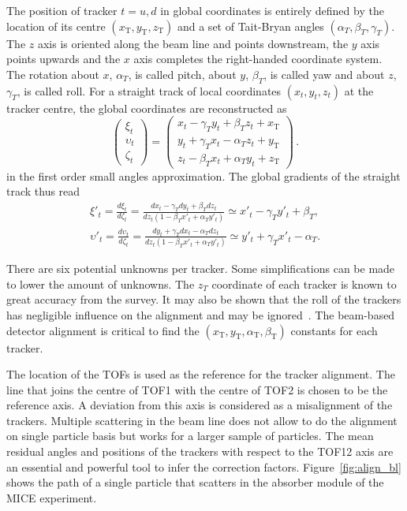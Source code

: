 The position of tracker $t=u,d$ in global coordinates is entirely defined by the location of its centre $(x_\mathrm{T},y_\mathrm{T},z_\mathrm{T})$ and a set of Tait-Bryan angles $(\alpha_T,\beta_T,\gamma_T)$. The $z$ axis is oriented along the beam line and points downstream, the $y$ axis points upwards and the $x$ axis completes the right-handed coordinate system. The rotation about $x$, $\alpha_T$, is called pitch, about $y$, $\beta_T$, is called yaw and about $z$, $\gamma_T$, is called roll. For a straight track of local coordinates $(x_t,y_t,z_t)$ at the tracker centre, the global coordinates are reconstructed as
\begin{equation}
\begin{pmatrix}
\xi_t \\
\upsilon_t \\
\zeta_t  
\end{pmatrix} =
\begin{pmatrix}
x_t-\gamma_T y_t+\beta_T z_t+x_\mathrm{T} \\
y_t+\gamma_T x_t-\alpha_T z_t+y_\mathrm{T} \\
z_t-\beta_T x_t+\alpha_T y_t+z_\mathrm{T}
\end{pmatrix}\, .
\label{eq:rot_matrix}
\end{equation}
in the first order small angles approximation. The global gradients of the straight track thus read
\begin{equation}
\begin{gathered}
\xi'_t = \frac{d\xi_t}{d\zeta_t} = \frac{dx_t-\gamma_Tdy_t+\beta_Tdz_t}{dz_t\left(1-\beta_Tx'_t+\alpha_Ty'_t\right)} \simeq x'_t-\gamma_T y'_t +\beta_T, \\
\upsilon'_t = \frac{d\upsilon_t}{d\zeta_t} = \frac{dy_t+\gamma_Tdx_t-\alpha_Tdz_t}{dz_t\left(1-\beta_Tx'_t+\alpha_Ty'_t\right)} \simeq y'_t+\gamma_T x'_t -\alpha_T.
\end{gathered}
\label{eq:global_grad}
\end{equation}

There are six potential unknowns per tracker. Some simplifications can be made to lower the amount of unknowns. The $z_T$ coordinate of each tracker is known to great accuracy from the survey. It may also be shown that the roll of the trackers has negligible influence on the alignment and may be ignored~\cite{2018arXiv1805.06623T}. The beam-based detector alignment is critical to find the $(x_\mathrm{T}, y_\mathrm{T}, \alpha_\mathrm{T}, \beta_\mathrm{T})$ constants for each tracker.

The location of the TOFs is used as the reference for the tracker alignment. The line that joins the centre of TOF1 with the centre of TOF2 is chosen to be the reference axis. A deviation from this axis is considered as a misalignment of the trackers. Multiple scattering in the beam line does not allow to do the alignment on single particle basis but works for a larger sample of particles. The mean residual angles and positions of the trackers with respect to the TOF12 axis are an essential and powerful tool to infer the correction factors. Figure~\ref{fig:align_bl} shows the path of a single particle that scatters in the absorber module of the MICE experiment.

